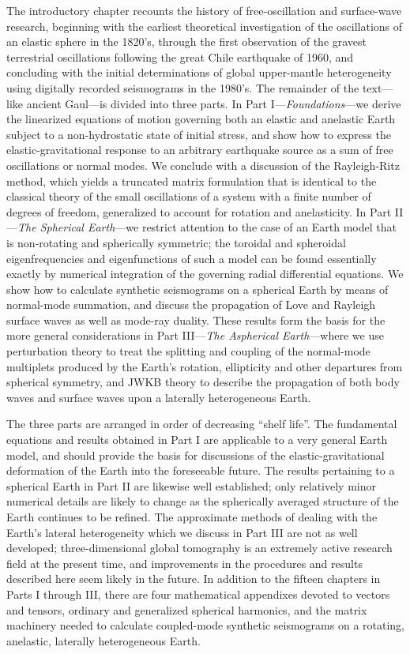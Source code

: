 The introductory chapter recounts the history of free-oscillation
and surface-wave research, beginning with the earliest theoretical
investigation of the oscillations of an elastic sphere in the 1820's,
through the first observation of the gravest terrestrial oscillations
following the great Chile earthquake of 1960, and concluding with
the initial determinations of global upper-mantle heterogeneity
using digitally recorded seismograms in the 1980's.
The remainder of the text---like ancient Gaul---is
divided into three parts. 
In Part I---{\em Foundations\/}---we derive the
linearized equations of motion
governing both an elastic and anelastic Earth
subject to a non-hydrostatic
state of initial stress, and show how to express the elastic-gravitational
response to an arbitrary earthquake source as a sum of free oscillations
or normal modes.  We conclude with a discussion of the Rayleigh-Ritz
method, which yields a truncated matrix formulation that is identical to the
classical theory of the small oscillations of a system with a finite
number of degrees of freedom, generalized to account for rotation
and anelasticity.  In Part II---{\em The Spherical Earth\/}---we restrict
attention to the case of an Earth model that is non-rotating and spherically
symmetric; the toroidal and spheroidal eigenfrequencies and eigenfunctions of
such a model can be found essentially exactly by numerical integration
of the governing radial differential equations.  We show how to calculate
synthetic seismograms on a spherical Earth by means of normal-mode summation,
and discuss the propagation of Love and Rayleigh surface waves as well as
mode-ray duality.  These results form the basis for the more general
considerations in Part III---{\em The Aspherical Earth\/}---where we use
perturbation theory to treat the splitting and coupling of the normal-mode
multiplets produced by the Earth's rotation, ellipticity and other departures
from spherical symmetry, and JWKB theory to describe the propagation of both
body waves and surface waves upon a laterally heterogeneous Earth.

\thispagestyle{myheadings} 
The three parts are arranged in order of decreasing ``shelf life''.
The fundamental equations and results obtained in
Part I are applicable to a very general Earth model, and should provide
the basis for discussions of the elastic-gravitational deformation
of the Earth into the foreseeable future.  The results pertaining to a
spherical Earth in Part II are likewise well established;
only relatively minor numerical details are likely to change as the
spherically averaged structure of the Earth continues to be refined.
The approximate methods of dealing with the Earth's lateral heterogeneity
which we discuss in Part III are not as well developed;
three-dimensional global tomography is an extremely active research field
at the present time, and improvements in the procedures and results
described here seem likely in the future.
In addition to the fifteen chapters in Parts I through III, there are four
mathematical appendixes devoted to vectors and tensors, ordinary and
generalized spherical harmonics, and the matrix machinery needed to
calculate coupled-mode synthetic seismograms on a rotating, anelastic,
laterally heterogeneous Earth.
 
